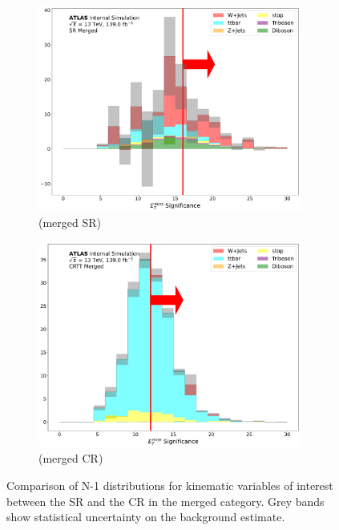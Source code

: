 \begin{figure}[htbp]
 \begin{subfigure}{0.45\textwidth}
     \includegraphics[width = 0.95\textwidth]{Figures/App_SR_CR_distributions/SR1L_Merged/MetTST_Significance_N_1.pdf}
    \caption{\metsig (merged SR)}
     \end{subfigure}
    \begin{subfigure}{0.45\textwidth}
     \includegraphics[width = 0.95\textwidth]{Figures/App_SR_CR_distributions/CRTT_Merged/MetTST_Significance_N_1.pdf}
     \caption{\metsig (merged \ttbar CR)}
     \end{subfigure}
      \caption{Comparison of N-1 distributions for kinematic variables of interest between the SR and the \ttbar CR in the merged category. Grey bands show statistical uncertainty on the background estimate.}
       \end{figure}

